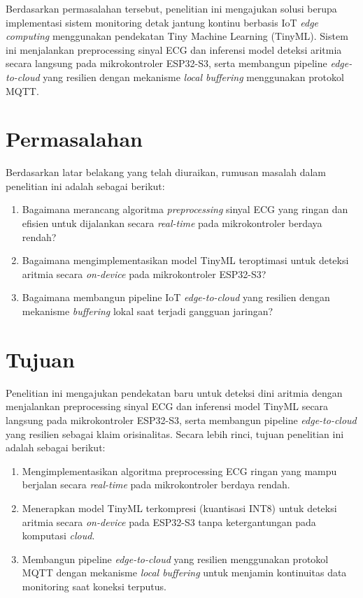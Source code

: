 Berdasarkan permasalahan tersebut, penelitian ini mengajukan solusi berupa implementasi sistem monitoring detak jantung kontinu berbasis IoT \textit{edge computing} menggunakan pendekatan Tiny Machine Learning (TinyML). Sistem ini menjalankan preprocessing sinyal ECG dan inferensi model deteksi aritmia secara langsung pada mikrokontroler ESP32-S3, serta membangun pipeline \textit{edge-to-cloud} yang resilien dengan mekanisme \textit{local buffering} menggunakan protokol MQTT.

\section{Permasalahan}
\label{sec:permasalahan}

Berdasarkan latar belakang yang telah diuraikan, rumusan masalah dalam penelitian ini adalah sebagai berikut:
\begin{enumerate}
  \item Bagaimana merancang algoritma \textit{preprocessing} sinyal ECG yang ringan dan efisien untuk dijalankan secara \textit{real-time} pada mikrokontroler berdaya rendah?
  \item Bagaimana mengimplementasikan model TinyML teroptimasi untuk deteksi aritmia secara \textit{on-device} pada mikrokontroler ESP32-S3?
  \item Bagaimana membangun pipeline IoT \textit{edge-to-cloud} yang resilien dengan mekanisme \textit{buffering} lokal saat terjadi gangguan jaringan?
\end{enumerate}

\section{Tujuan}
\label{sec:tujuan}

Penelitian ini mengajukan pendekatan baru untuk deteksi dini aritmia dengan menjalankan preprocessing sinyal ECG dan inferensi model TinyML secara langsung pada mikrokontroler ESP32-S3, serta membangun pipeline \textit{edge-to-cloud} yang resilien sebagai klaim orisinalitas. Secara lebih rinci, tujuan penelitian ini adalah sebagai berikut:
\begin{enumerate}
  \item Mengimplementasikan algoritma preprocessing ECG ringan yang mampu berjalan secara \textit{real-time} pada mikrokontroler berdaya rendah.
  \item Menerapkan model TinyML terkompresi (kuantisasi INT8) untuk deteksi aritmia secara \textit{on-device} pada ESP32-S3 tanpa ketergantungan pada komputasi \textit{cloud}.
  \item Membangun pipeline \textit{edge-to-cloud} yang resilien menggunakan protokol MQTT dengan mekanisme \textit{local buffering} untuk menjamin kontinuitas data monitoring saat koneksi terputus.
\end{enumerate}

